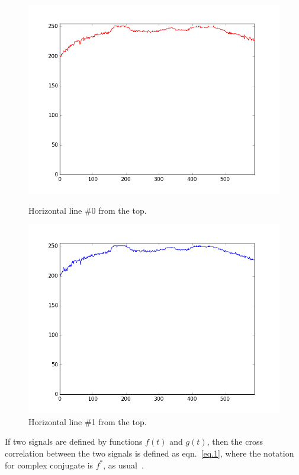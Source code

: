 \documentclass[a4paper,12pt]{article}
\begin{document}
\begin{figure}[h]
\centering
\begin{minipage}{.5\textwidth}
  \centering
  \includegraphics[width=1.05\linewidth]{img/line0}
  \caption{Horizontal line \#0 from the top.}
  \label{fig.2}
\end{minipage}%
\begin{minipage}{.5\textwidth}
  \centering
  \includegraphics[width=1.05\linewidth]{img/line1}
  \caption{Horizontal line \#1 from the top.}
  \label{fig.3}
\end{minipage}
\end{figure}

If two signals are defined by functions $f(t)$ and $g(t)$, then the cross correlation between the two signals is defined as eqn.~\ref{eq.1}, where the notation for complex conjugate is $f^*$, as usual~\cite{bracewell2012fourier}.  
\end{document}
